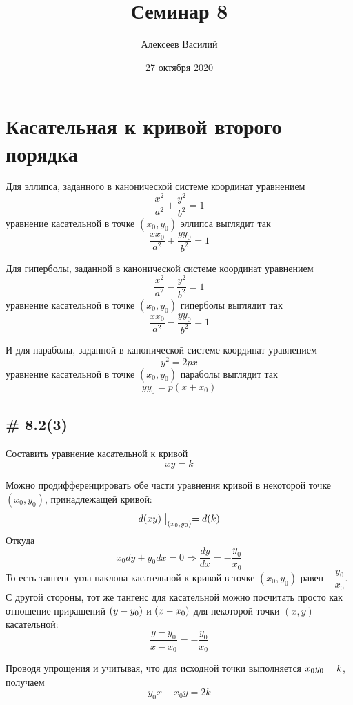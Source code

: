 \documentclass[a4paper,12pt]{article}
\author{Алексеев Василий}
\title{Семинар 8}
\date{27 октября 2020}  %
\begin{document}
  \maketitle
  
  \tableofcontents

  \thispagestyle{empty}
  
  \newpage
  


  \section{Касательная к кривой второго порядка}
  
  Для эллипса, заданного в канонической системе координат уравнением
  \[
    \frac{x^2}{a^2} + \frac{y^2}{b^2} = 1
  \]
  уравнение касательной в точке $(x_0, y_0)$ эллипса выглядит так
  \[
    \boxed{\frac{xx_0}{a^2} + \frac{yy_0}{b^2} = 1}
  \]
  
  Для гиперболы, заданной в канонической системе координат уравнением
  \[
    \frac{x^2}{a^2} - \frac{y^2}{b^2} = 1
  \]
  уравнение касательной в точке $(x_0, y_0)$ гиперболы выглядит так
  \[
    \boxed{\frac{xx_0}{a^2} - \frac{yy_0}{b^2} = 1}
  \]
  
  И для параболы, заданной в канонической системе координат уравнением
  \[
    y^2 = 2px
  \]
  уравнение касательной в точке $(x_0, y_0)$ параболы выглядит так
  \[
    \boxed{yy_0 = p (x + x_0)}
  \]
  
  
  \subsection{\# 8.2(3)}
  
  Составить уравнение касательной к кривой
  \[
    xy = k
  \]

  \begin{solution}
    Можно продифференцировать обе части уравнения кривой в некоторой точке $(x_0, y_0)$, принадлежащей кривой:
    \[
      d(xy)\bigm|_{(x_0, y_0)} = d(k)
    \]
    Откуда
    \[
      x_0 dy + y_0 dx = 0 \Rightarrow \frac{dy}{dx} = -\frac{y_0}{x_0}
    \]
    То есть тангенс угла наклона касательной к кривой в точке $(x_0, y_0)$ равен $-\dfrac{y_0}{x_0}$.
    С другой стороны, тот же тангенс для касательной можно посчитать просто как отношение приращений $(y \hm- y_0)$ и $(x \hm- x_0)$ для некоторой точки $(x, y)$ касательной:
    \[
      \frac{y - y_0}{x - x_0} = -\frac{y_0}{x_0}
    \]
    
    Проводя упрощения и учитывая, что для исходной точки выполняется $x_0 y_0 \hm= k$, получаем
    \[
      y_0 x + x_0 y = 2k
    \]
  \end{solution}
  
\end{document}

